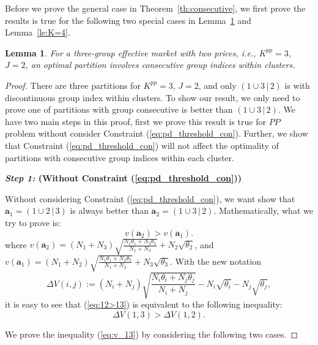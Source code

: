 \documentclass[twocolumn,10pt,twosided]{IEEEtran}
\newtheorem{lemma}{Lemma}
\begin{document}
Before we prove the general case in Theorem~\ref{th:consecutive},  we first prove the results is true for the following two special cases in Lemma~\ref{le:K_0=3} and Lemma~\ref{le:K=4}.
\begin{lemma}
\label{le:K_0=3}
For a three-group effective market with two prices, i.e., $K^{pp}=3$, $J=2$, an optimal partition involves consecutive group indices within clusters.
\end{lemma}
\begin{proof}
There are three partitions for  $K^{pp}=3$, $J=2$, and only $(1\cup
3\,|\,2)$ is with discontinuous group index within clusters. To show our result, we only need to prove one of partitions with group consecutive is better than $(1\cup 3\,|\,2)$.
We have two main steps in this proof, first we prove this result is true for $PP$ problem without consider Constraint (\ref{eq:pd_threshold_con}). Further, we show that Constraint (\ref{eq:pd_threshold_con}) will not affect the optimality of partitions with consecutive group indices within each cluster.


\textbf{\emph{Step 1:} (Without Constraint (\ref{eq:pd_threshold_con}))}

Without considering Constraint (\ref{eq:pd_threshold_con}), we want show that $\boldsymbol{a}_1=(1\cup 2\,|\,3)$ is
always better than $\boldsymbol{a}_2=(1\cup 3\,|\,2)$. Mathematically, what we try to
prove is:
\begin{equation}
v(\boldsymbol{a}_2)>v(\boldsymbol{a}_1).
\label{eq:12>13}
\end{equation}
where $v(\boldsymbol{a}_2)=(N_1+N_3)\sqrt{\frac{N_1\theta_1+N_3\theta_3}{N_1+N_3}}+N_2\sqrt{\theta_2}$, and
$v(\boldsymbol{a}_1)=(N_1+N_2)\sqrt{\frac{N_1\theta_1+N_2\theta_2}{N_1+N_2}}+N_3\sqrt{\theta_3}$.
With the new notation
$$\Delta V(i,j):=(N_i+N_j)\sqrt{\frac{N_i\theta_i+N_j\theta_j}
{N_i+N_j}}-N_i\sqrt{\theta_i}-N_j\sqrt{\theta_j},$$
it is easy to see that (\ref{eq:12>13}) is equivalent to the following inequality: \begin{equation}
\Delta V(1,3)>\Delta V(1,2). \label{eq:v_13}
\end{equation}

We prove the inequality (\ref{eq:v_13}) by considering the following
two cases.


\end{proof}
\end{document}
